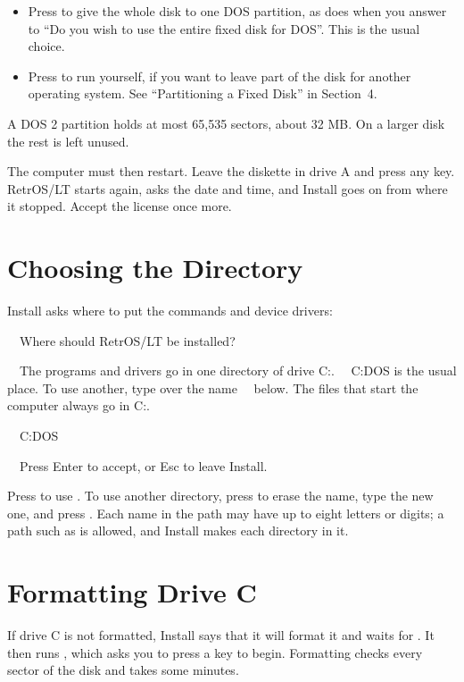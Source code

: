 \begin{itemize}
\item Press  to give the whole disk to one DOS partition, as
   does when you answer  to ``Do you wish to use the
  entire fixed disk for DOS''. This is the usual choice.
\item Press  to run  yourself, if you want to leave
  part of the disk for another operating system. See ``Partitioning a
  Fixed Disk'' in Section~4.
\end{itemize}

A DOS 2 partition holds at most 65,535 sectors, about 32 MB. On a larger
disk the rest is left unused.

The computer must then restart. Leave the diskette in drive A and press
any key. RetrOS/LT starts again, asks the date and time, and Install goes
on from where it stopped. Accept the license once more.

\section{Choosing the Directory}

Install asks where to put the commands and device drivers:

\begin{dialogue}
\ \ Where should RetrOS/LT be installed?

\ \ The programs and drivers go in one directory of drive C:.
\ \ C:\bs{}DOS is the usual place. To use another, type over the name
\ \ below. The files that start the computer always go in C:\bs.

\ \ C:\bs{}DOS

\ \ Press Enter to accept, or Esc to leave Install.
\end{dialogue}

Press  to use . To use another directory, press
 to erase the name, type the new one, and press
. Each name in the path may have up to eight letters or digits;
a path such as  is allowed, and Install makes each
directory in it.

\section{Formatting Drive C}

If drive C is not formatted, Install says that it will format it and
waits for . It then runs , which asks you to
press a key to begin. Formatting checks every sector of the disk and takes
some minutes.

